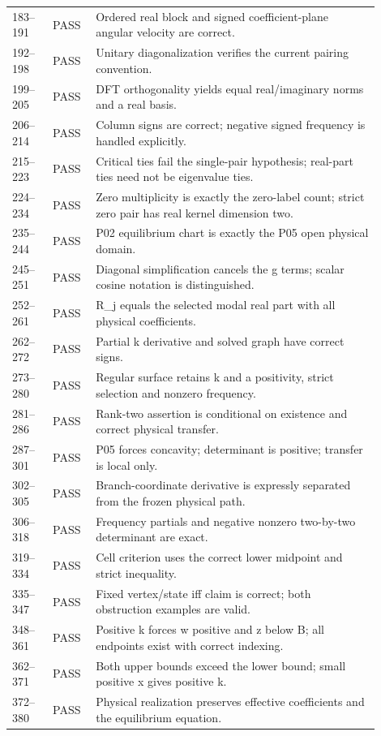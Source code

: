 \documentclass[11pt]{article}
\begin{document}
\begin{longtable}{p{0.10\linewidth}p{0.10\linewidth}p{0.70\linewidth}}
183--191&PASS&Ordered real block and signed coefficient-plane angular velocity are correct.\\
192--198&PASS&Unitary diagonalization verifies the current pairing convention.\\
199--205&PASS&DFT orthogonality yields equal real/imaginary norms and a real basis.\\
206--214&PASS&Column signs are correct; negative signed frequency is handled explicitly.\\
215--223&PASS&Critical ties fail the single-pair hypothesis; real-part ties need not be eigenvalue ties.\\
224--234&PASS&Zero multiplicity is exactly the zero-label count; strict zero pair has real kernel dimension two.\\
235--244&PASS&P02 equilibrium chart is exactly the P05 open physical domain.\\
245--251&PASS&Diagonal simplification cancels the g terms; scalar cosine notation is distinguished.\\
252--261&PASS&R\_j equals the selected modal real part with all physical coefficients.\\
262--272&PASS&Partial k derivative and solved graph have correct signs.\\
273--280&PASS&Regular surface retains k and a positivity, strict selection and nonzero frequency.\\
281--286&PASS&Rank-two assertion is conditional on existence and correct physical transfer.\\
287--301&PASS&P05 forces concavity; determinant is positive; transfer is local only.\\
302--305&PASS&Branch-coordinate derivative is expressly separated from the frozen physical path.\\
306--318&PASS&Frequency partials and negative nonzero two-by-two determinant are exact.\\
319--334&PASS&Cell criterion uses the correct lower midpoint and strict inequality.\\
335--347&PASS&Fixed vertex/state iff claim is correct; both obstruction examples are valid.\\
348--361&PASS&Positive k forces w positive and z below B; all endpoints exist with correct indexing.\\
362--371&PASS&Both upper bounds exceed the lower bound; small positive x gives positive k.\\
372--380&PASS&Physical realization preserves effective coefficients and the equilibrium equation.\\

\end{longtable}
\end{document}
